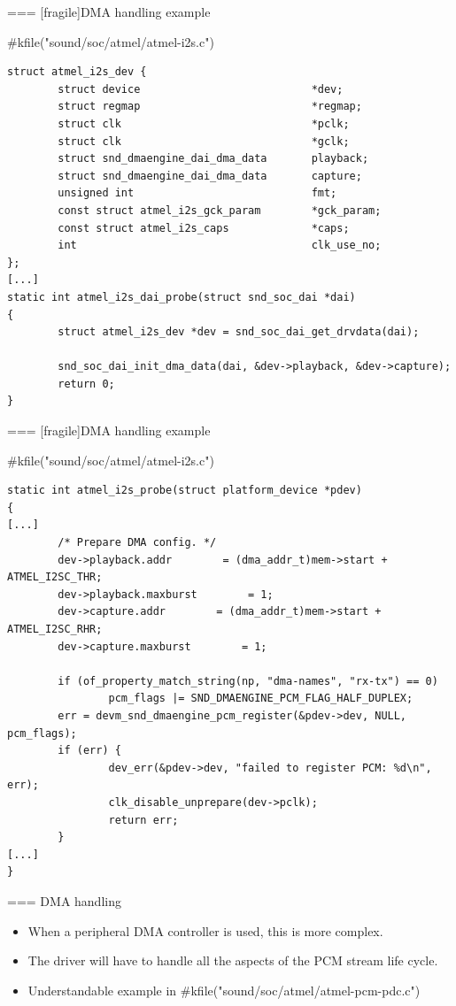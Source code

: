 === [fragile]{DMA handling example}
  \begin{block}{#kfile("sound/soc/atmel/atmel-i2s.c")}
    \fontsize{8}{7}\selectfont
    \begin{verbatim}
struct atmel_i2s_dev {
        struct device                           *dev;
        struct regmap                           *regmap;
        struct clk                              *pclk;
        struct clk                              *gclk;
        struct snd_dmaengine_dai_dma_data       playback;
        struct snd_dmaengine_dai_dma_data       capture;
        unsigned int                            fmt;
        const struct atmel_i2s_gck_param        *gck_param;
        const struct atmel_i2s_caps             *caps;
        int                                     clk_use_no;
};
[...]
static int atmel_i2s_dai_probe(struct snd_soc_dai *dai)
{
        struct atmel_i2s_dev *dev = snd_soc_dai_get_drvdata(dai);

        snd_soc_dai_init_dma_data(dai, &dev->playback, &dev->capture);
        return 0;
}
    \end{verbatim}
  \end{block}


=== [fragile]{DMA handling example}
  \begin{block}{#kfile("sound/soc/atmel/atmel-i2s.c")}
    \fontsize{8}{8}\selectfont
    \begin{verbatim}
static int atmel_i2s_probe(struct platform_device *pdev)
{
[...]
        /* Prepare DMA config. */
        dev->playback.addr        = (dma_addr_t)mem->start + ATMEL_I2SC_THR;
        dev->playback.maxburst        = 1;
        dev->capture.addr        = (dma_addr_t)mem->start + ATMEL_I2SC_RHR;
        dev->capture.maxburst        = 1;

        if (of_property_match_string(np, "dma-names", "rx-tx") == 0)
                pcm_flags |= SND_DMAENGINE_PCM_FLAG_HALF_DUPLEX;
        err = devm_snd_dmaengine_pcm_register(&pdev->dev, NULL, pcm_flags);
        if (err) {
                dev_err(&pdev->dev, "failed to register PCM: %d\n", err);
                clk_disable_unprepare(dev->pclk);
                return err;
        }
[...]
}
    \end{verbatim}
  \end{block}


=== {DMA handling}
  \begin{itemize}
  \item When a peripheral DMA controller is used, this is more
    complex.
  \item The driver will have to handle all the aspects of the PCM
    stream life cycle.
  \item Understandable example in #kfile("sound/soc/atmel/atmel-pcm-pdc.c")
  \end{itemize}



